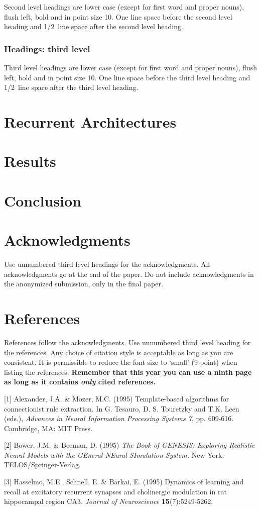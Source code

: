 \documentclass{article} %
\begin{document}
Second level headings are lower case (except for first word and proper nouns),
flush left, bold and in point size 10. One line space before the second level
heading and 1/2~line space after the second level heading.

\subsubsection{Headings: third level}

Third level headings are lower case (except for first word and proper nouns),
flush left, bold and in point size 10. One line space before the third level
heading and 1/2~line space after the third level heading.

\section{Recurrent Architectures}
\section{Results}
\section{Conclusion}

\section*{Acknowledgments}

Use unnumbered third level headings for the acknowledgments. All
acknowledgments go at the end of the paper. Do not include 
acknowledgments in the anonymized submission, only in the 
final paper. 

\section*{References}

References follow the acknowledgments. Use unnumbered third level heading for
the references. Any choice of citation style is acceptable as long as you are
consistent. It is permissible to reduce the font size to `small' (9-point) 
when listing the references. {\bf Remember that this year you can use
a ninth page as long as it contains \emph{only} cited references.}

\small{
[1] Alexander, J.A. \& Mozer, M.C. (1995) Template-based algorithms
for connectionist rule extraction. In G. Tesauro, D. S. Touretzky
and T.K. Leen (eds.), {\it Advances in Neural Information Processing
Systems 7}, pp. 609-616. Cambridge, MA: MIT Press.

[2] Bower, J.M. \& Beeman, D. (1995) {\it The Book of GENESIS: Exploring
Realistic Neural Models with the GEneral NEural SImulation System.}
New York: TELOS/Springer-Verlag.

[3] Hasselmo, M.E., Schnell, E. \& Barkai, E. (1995) Dynamics of learning
and recall at excitatory recurrent synapses and cholinergic modulation
in rat hippocampal region CA3. {\it Journal of Neuroscience}
{\bf 15}(7):5249-5262.
}
\end{document}
